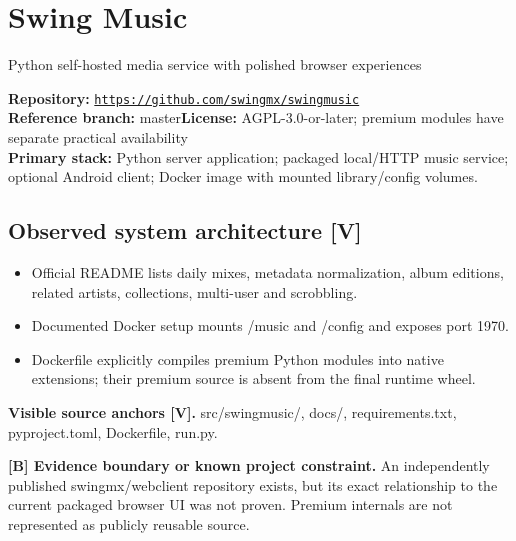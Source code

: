 \documentclass[10pt,a4paper,oneside]{report}
\newcommand{\tagboundary}{\textbf{[B] Evidence boundary or known project constraint.}}
\newcommand{\sourceurl}[1]{\href{#1}{\texttt{\nolinkurl{#1}}}}
\begin{document}
\chapter{Swing Music}
{\large\color{muted}Python self-hosted media service with polished browser experiences}\par
\begin{evidencebox}\small\textbf{Repository:} \sourceurl{https://github.com/swingmx/swingmusic}\\\textbf{Reference branch:} master\qquad \textbf{License:} AGPL-3.0-or-later; premium modules have separate practical availability\\\textbf{Primary stack:} Python server application; packaged local/HTTP music service; optional Android client; Docker image with mounted library/config volumes.\end{evidencebox}
\section{Observed system architecture [V]}
\begin{itemize}[leftmargin=*,itemsep=2pt,topsep=3pt]
\item Official README lists daily mixes, metadata normalization, album editions, related artists, collections, multi-user and scrobbling.
\item Documented Docker setup mounts /music and /config and exposes port 1970.
\item Dockerfile explicitly compiles premium Python modules into native extensions; their premium source is absent from the final runtime wheel.
\end{itemize}
\textbf{Visible source anchors [V].} src/swingmusic/, docs/, requirements.txt, pyproject.toml, Dockerfile, run.py.\par
\begin{evidencebox}\tagboundary{} An independently published swingmx/webclient repository exists, but its exact relationship to the current packaged browser UI was not proven. Premium internals are not represented as publicly reusable source.\end{evidencebox}
\end{document}
